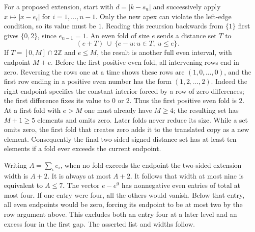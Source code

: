 \documentclass[11pt,a4paper]{article}
\begin{document}
For a proposed extension, start with $d=|k-s_n|$ and successively apply $x\mapsto |x-e_i|$ for $i=1,\ldots,n-1$. Only the new apex can violate the left-edge condition, so its value must be $1$. Reading this recursion backwards from $\{1\}$ first gives $\{0,2\}$, since $e_{n-1}=1$. An even fold of size $e$ sends a distance set $T$ to
\[
     (e+T)\ \cup\ \{e-u:u\in T,\ u\le e\}.
\]
If $T=[0,M]\cap2\mathbb Z$ and $e\le M$, the result is another full even interval, with endpoint $M+e$. Before the first positive even fold, all intervening rows end in zero. Reversing the rows one at a time shows these rows are $(1,0,\ldots,0)$, and the first row ending in a positive even number has the form $(1,2,\ldots,2)$. Indeed the right endpoint specifies the constant interior forced by a row of zero differences; the first difference fixes its value to $0$ or $2$. Thus the first positive even fold is $2$. At a first fold with $e>M$ one must already have $M\ge4$; the resulting set has $M+1\ge5$ elements and omits zero. Later folds never reduce its size. While a set omits zero, the first fold that creates zero adds it to the translated copy as a new element. Consequently the final two-sided signed distance set has at least ten elements if a fold ever exceeds the current endpoint.

Writing $A=\sum_i e_i$, when no fold exceeds the endpoint the two-sided extension width is $A+2$. It is always at most $A+2$. It follows that width at most nine is equivalent to $A\le7$. The vector $e-e^0$ has nonnegative even entries of total at most four. If one entry were four, all the others would vanish. Below that entry, all even endpoints would be zero, forcing its endpoint to be at most two by the row argument above. This excludes both an entry four at a later level and an excess four in the first gap. The asserted list and widths follow.
\end{document}
